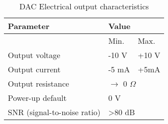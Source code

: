 \begin{table}[H]
\centering
\begin{tabular}{|l|ll|}
\hline
\rowcolor[HTML]{34CDF9} 
Parameter                   & \multicolumn{2}{l|}{\cellcolor[HTML]{34CDF9}Value} \\ \hline
                            & \multicolumn{1}{l|}{Min.}          & Max.          \\
Output voltage              & \multicolumn{1}{l|}{-10 V}         & +10 V         \\
Output current              & \multicolumn{1}{l|}{-5 mA}         & +5mA          \\ \hline
Output resistance           & \multicolumn{2}{l|}{$\rightarrow$ 0 $\Omega$}                         \\ \hline
Power-up default            & \multicolumn{2}{l|}{0 V}                           \\ \hline
SNR (signal-to-noise ratio) & \multicolumn{2}{l|}{\textgreater 80 dB}            \\ \hline
\end{tabular}
\caption{DAC Electrical output characteristics}
\end{table}